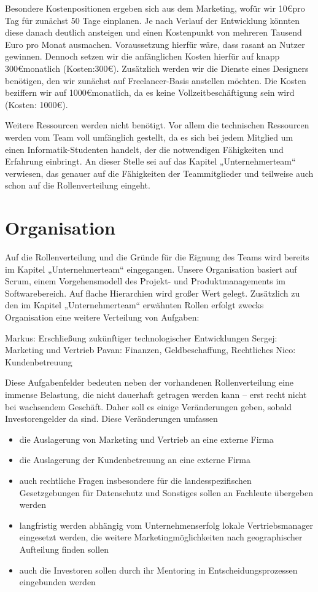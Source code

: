 Besondere Kostenpositionen ergeben sich aus dem Marketing, wofür wir 10\euro pro Tag für zunächst 50 Tage einplanen. Je nach Verlauf der Entwicklung könnten diese danach deutlich ansteigen und einen Kostenpunkt von mehreren Tausend Euro pro Monat ausmachen. Voraussetzung hierfür wäre, dass rasant an Nutzer gewinnen. Dennoch setzen wir die anfänglichen Kosten hierfür auf knapp 300\euro monatlich  (Kosten:300\euro).
Zusätzlich werden wir die Dienste eines Designers benötigen, den wir zunächst auf Freelancer-Basis anstellen möchten. Die Kosten beziffern wir auf 1000\euro monatlich, da es keine Vollzeitbeschäftigung sein wird  (Kosten: 1000\euro).

Weitere Ressourcen werden nicht benötigt. Vor allem die technischen Ressourcen werden vom Team voll umfänglich gestellt, da es sich bei jedem Mitglied um einen Informatik-Studenten handelt, der die notwendigen Fähigkeiten und Erfahrung einbringt. An dieser Stelle sei auf das Kapitel „Unternehmerteam“ verwiesen, das genauer auf die Fähigkeiten der Teammitglieder und teilweise auch schon auf die Rollenverteilung eingeht.


\section{Organisation}
Auf die Rollenverteilung und die Gründe für die Eignung des Teams wird bereits im Kapitel „Unternehmerteam“ eingegangen. Unsere Organisation basiert auf Scrum, einem Vorgehensmodell des Projekt- und Produktmanagements im Softwarebereich. Auf flache Hierarchien wird großer Wert gelegt. Zusätzlich zu den im Kapitel „Unternehmerteam“ erwähnten Rollen erfolgt zwecks Organisation eine weitere Verteilung von Aufgaben:

Markus: Erschließung zukünftiger technologischer Entwicklungen
Sergej: Marketing und Vertrieb
Pavan: Finanzen, Geldbeschaffung, Rechtliches
Nico: Kundenbetreuung

Diese Aufgabenfelder bedeuten neben der vorhandenen Rollenverteilung eine immense Belastung, die nicht dauerhaft getragen werden kann – erst recht nicht bei wachsendem Geschäft. Daher soll es einige Veränderungen geben, sobald Investorengelder da sind. Diese Veränderungen umfassen

\begin{itemize}
\item die Auslagerung von Marketing und Vertrieb an eine externe Firma
\item die Auslagerung der Kundenbetreuung an eine externe Firma
\item auch rechtliche Fragen insbesondere für die landesspezifischen Gesetzgebungen für Datenschutz und Sonstiges sollen an Fachleute übergeben werden
\item langfristig werden abhängig vom Unternehmenserfolg lokale Vertriebsmanager eingesetzt werden, die weitere Marketingmöglichkeiten nach geographischer Aufteilung finden sollen
\item auch die Investoren sollen durch ihr Mentoring in Entscheidungsprozessen eingebunden werden
\end{itemize}


